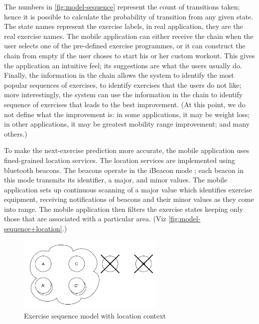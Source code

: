 \documentclass[a4paper, 10 pt, conference]{IEEEtran}
\begin{document}
The numbers in \autoref{fig:model-sequence} represent the count of transitions taken; hence it is possible to calculate the probability of transition from any given state. The state names represent the exercise labels, in real application, they are the real exercise names. The mobile application can either receive the chain when the user selects one of the pre-defined exercise programmes, or it can construct the chain from empty if the user choses to start his or her custom workout. This gives the application an intuitive feel; its suggestions are what the users usually do. Finally, the information in the chain allows the system to identify the most popular sequences of exercises, to identify exercises that the users do not like; more interestingly, the system can use the information in the chain to identify sequence of exercises that leads to the best improvement. (At this point, we do not define what the improvement is: in some applications, it may be weight loss; in other applications, it may be greatest mobility range improvement; and many others.)

To make the next-exercise prediction more accurate, the mobile application uses fined-grained location services. The location services are implemented using bluetooth beacons. The beacons operate in the iBeacon mode \cite{ibeacon}; each beacon in this mode transmits its identifier, a major, and minor values. The mobile application sets up continuous scanning of a major value which identifies exercise equipment, receiving notifications of beacons and their minor values as they come into range. The mobile application then filters the exercise states keeping only those that are associated with a particular area. (Viz \autoref{fig:model-sequence+location}.)

\begin{figure}[h]
    \begin{center}
        \caption{Exercise sequence model with location context}
        \label{fig:model-sequence+location}
        \includegraphics[width=7cm,keepaspectratio]{ri-model-sequence+location.png}
    \end{center}
\end{figure}
\end{document}
